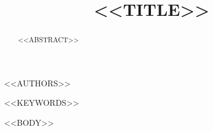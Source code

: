 \documentclass[final,5p]{elsarticle}
\begin{document}
\begin{frontmatter}

\title{<<TITLE>>}

<<AUTHORS>>

\begin{abstract}
<<ABSTRACT>>
\end{abstract}

\begin{highlights}
\item {}
\item {}
\item {}
\end{highlights}

\begin{keyword}
<<KEYWORDS>>
\end{keyword}

\end{frontmatter}

<<BODY>>



\end{document}
